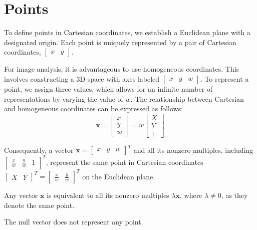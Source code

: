 \section{Points}

To define points in Cartesian coordinates, we establish a Euclidean plane with a designated origin. 
Each point is uniquely represented by a pair of Cartesian coordinates, $\begin{bmatrix} x & y \end{bmatrix}$.

For image analysis, it is advantageous to use homogeneous coordinates.
This involves constructing a 3D space with axes labeled $\begin{bmatrix} x & y & w \end{bmatrix}$. 
To represent a point, we assign three values, which allows for an infinite number of representations by varying the value of $w$.
The relationship between Cartesian and homogeneous coordinates can be expressed as follows:
\[\mathbf{x} = \begin{bmatrix} x \\ y \\ w \end{bmatrix} = w \begin{bmatrix} X \\ Y \\ 1 \end{bmatrix}\]

Consequently, a vector $\mathbf{x} = {\begin{bmatrix} x & y & w \end{bmatrix}}^T$ and all its nonzero multiples, including ${\begin{bmatrix} \frac{x}{w} & \frac{y}{w} & 1 \end{bmatrix}}^T$, represent the same point in Cartesian coordinates ${\begin{bmatrix} X & Y \end{bmatrix}}^T={\begin{bmatrix}  \frac{x}{w} &  \frac{y}{w} \end{bmatrix}}^T$ on the Euclidean plane. 
\begin{property}[Homogeneity]
    Any vector $\mathbf{x}$ is equivalent to all its nonzero multiples $\lambda \mathbf{x}$, where $\lambda \neq 0$, as they denote the same point.
\end{property}
The null vector does not represent any point.

